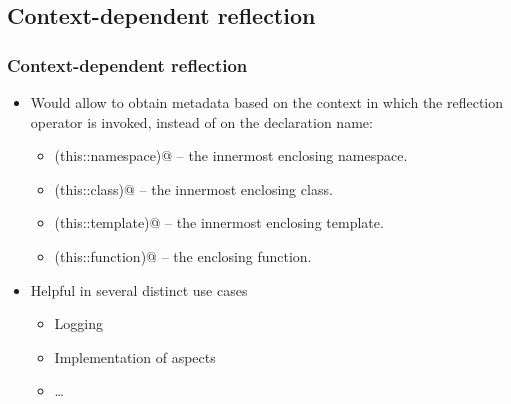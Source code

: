 \documentclass[compress,table,xcolor=table]{beamer}
\begin{document}
\subsection{Context-dependent reflection}
\begin{frame}[fragile]
\frametitle{Context-dependent reflection}
  \small
  \begin{itemize}
    \item Would allow to obtain metadata based on the context in which the
      reflection operator is invoked, instead of on the declaration name:
    \begin{itemize}
      \item \verb@reflexpr(this::namespace)@ -- the innermost enclosing namespace.
      \item \verb@reflexpr(this::class)@ -- the innermost enclosing class.
      \item \verb@reflexpr(this::template)@ -- the innermost enclosing template.
      \item \verb@reflexpr(this::function)@ -- the enclosing function.
    \end{itemize}
    \item Helpful in several distinct use cases
      \begin{itemize}
        \item Logging
        \item Implementation of aspects
        \item \ldots
      \end{itemize}
  \end{itemize}
\end{frame}
\end{document}
